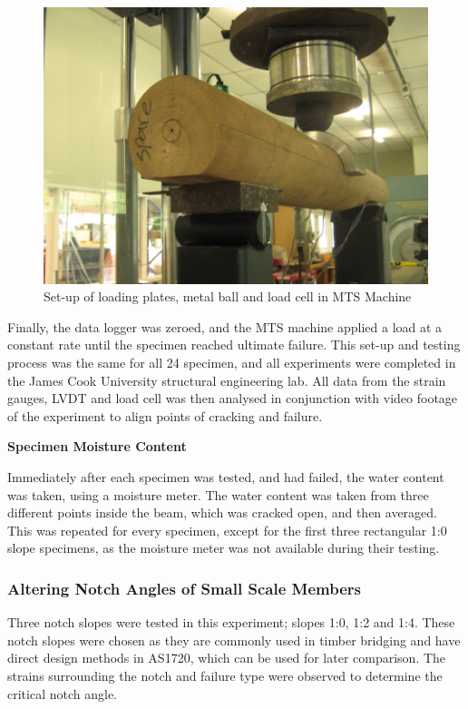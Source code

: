 \documentclass[11pt,a4paper]{article}
\numberwithin{equation}{subsection}
\begin{document}
\vspace*{\baselineskip}

\begin{figure}[h]
	\begin{center}
		\includegraphics[scale=0.35]{SETUP}
	\end{center}
	\caption{Set-up of loading plates, metal ball and load cell in MTS Machine}
	\label{fig:SETUP}
\end{figure}
\pagebreak
\noindent
Finally, the data logger was zeroed, and the MTS machine applied a load at a constant rate until the specimen reached ultimate failure. This set-up and testing process was the same for all 24 specimen, and all experiments were completed in the James Cook University structural engineering lab. All data from the strain gauges, LVDT and load cell was then analysed in conjunction with video footage of the experiment to align points of cracking and failure.

\vspace*{\baselineskip}

\noindent
\textbf{Specimen Moisture Content}\par
\noindent
Immediately after each specimen was tested, and had failed, the water content was taken, using a moisture meter. The water content was taken from three different points inside the beam, which was cracked open, and then averaged. This was repeated for every specimen, except for the first three rectangular 1:0 slope specimens, as the moisture meter was not available during their testing. 

\pagebreak
\subsubsection{Altering Notch Angles of Small Scale Members}
Three notch slopes were tested in this experiment; slopes 1:0, 1:2 and 1:4. These notch slopes were chosen as they are commonly used in timber bridging and have direct design methods in AS1720, which can be used for later comparison. The strains surrounding the notch and failure type were observed to determine the critical notch angle. 
\end{document}

